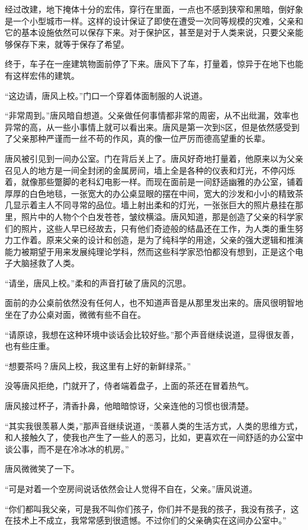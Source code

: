 经过改建，地下掩体十分的宏伟，穿行在里面，一点也不感到狭窄和黑暗，倒好象是一个小型城市一样。这样的设计保证了即使在遭受一次同等规模的灾难，父亲和它的基本设施依然可以保存下来。对于保护区，甚至是对于人类来说，只要父亲能够保存下来，就等于保存了希望。

终于，车子在一座建筑物面前停了下来。唐风下了车，打量着，惊异于在地下也能有这样宏伟的建筑。

“这边请，唐风上校。”门口一个穿着体面制服的人说道。

“非常周到。”唐风暗自想道。父亲做任何事情都非常的周密，从不出纰漏，效率也异常的高，从一些小事情上就可以看出来。唐风是第一次到S区，但是依然感受到了父亲那种严谨而一丝不苟的作风，真的像一位严厉而德高望重的长辈。

唐风被引见到一间办公室。门在背后关上了。唐风好奇地打量着，他原来以为父亲召见人的地方是一间全封闭的金属房间，墙上全是各种的仪表和灯光，不停闪烁着，就像那些蹩脚的老科幻电影一样。而现在面前是一间舒适幽雅的办公室，铺着厚厚的白色地毯，一张宽大的办公桌显眼的摆在中间，宽大的沙发和小小的精致茶几显示着主人不同寻常的品位。墙上射出柔和的灯光，一张张巨大的照片悬挂在那里，照片中的人物个个白发苍苍，皱纹横溢。唐风知道，那是创造了父亲的科学家们的照片，这些人早已经故去，只有他们奇迹般的结晶还在工作，为人类的重生努力工作着。原来父亲的设计和创造，是为了纯科学的用途，父亲的强大逻辑和推演能力被期望于用来发展纯理论学科，然而这些科学家恐怕都没有想到，正是这个电子大脑拯救了人类。

“请坐，唐风上校。”柔和的声音打破了唐风的沉思。

面前的办公桌前依然没有任何人，也不知道声音是从那里发出来的。唐风很明智地坐在了办公桌对面，微微有些不自在。

“请原谅，我想在这种环境中谈话会比较好些。”那个声音继续说道，显得很友善，也有些庄重。

“想要茶吗？唐风上校，我这里有上好的新鲜绿茶。”

没等唐风拒绝，门就开了，侍者端着盘子，上面的茶还在冒着热气。

唐风接过杯子，清香扑鼻，他暗暗惊讶，父亲连他的习惯也很清楚。

“其实我很羡慕人类，”那声音继续说道，“羡慕人类的生活方式，人类的思维方式，和人接触久了，使我也产生了一些人的恶习，比如，更喜欢在一间舒适的办公室中谈公事，而不是在冷冰冰的机房。”

唐风微微笑了一下。

“可是对着一个空房间说话依然会让人觉得不自在，父亲。”唐风说道。

“你们都叫我父亲，可是我不叫你们孩子，你们并不是我的孩子，我没有孩子，这在技术上不成立，我常常感到很遗憾。不过你们的父亲确实在这间办公室中。”

